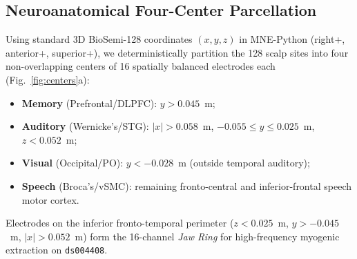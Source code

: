 \documentclass[journal]{IEEEtran}
\begin{document}
\subsection{Neuroanatomical Four-Center Parcellation}
Using standard 3D BioSemi-128 coordinates $(x, y, z)$ in MNE-Python (right+, anterior+, superior+), we deterministically partition the 128 scalp sites into four non-overlapping centers of 16 spatially balanced electrodes each (Fig.~\ref{fig:centers}a):
\begin{itemize}
    \item \textbf{Memory} (Prefrontal/DLPFC): $y > 0.045$~m;
    \item \textbf{Auditory} (Wernicke's/STG): $|x| > 0.058$~m, $-0.055 \le y \le 0.025$~m, $z < 0.052$~m;
    \item \textbf{Visual} (Occipital/PO): $y < -0.028$~m (outside temporal auditory);
    \item \textbf{Speech} (Broca's/vSMC): remaining fronto-central and inferior-frontal speech motor cortex.
\end{itemize}
Electrodes on the inferior fronto-temporal perimeter ($z < 0.025$~m, $y > -0.045$~m, $|x| > 0.052$~m) form the 16-channel \emph{Jaw Ring} for high-frequency myogenic extraction on \texttt{ds004408}.
\end{document}

